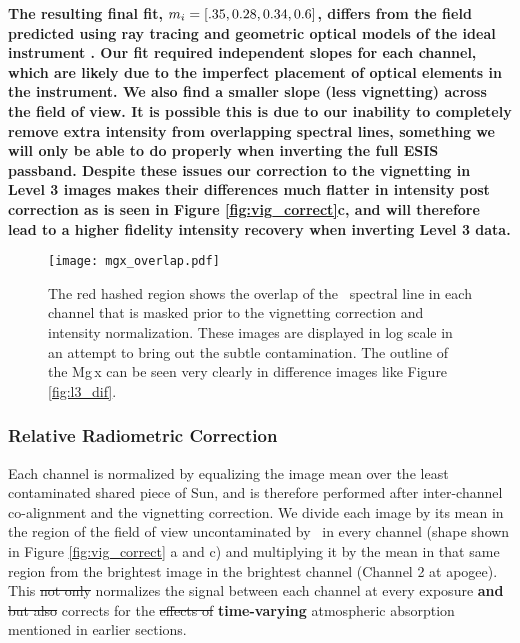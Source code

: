 \textbf{The resulting final fit, $m_i = [.35, 0.28, 0.34, 0.6]$, differs from the field predicted using ray tracing and geometric optical models of the ideal instrument \citep{ESIS}.
Our fit required independent slopes for each channel, which are likely due to the imperfect placement of optical elements in the instrument.
We also find a smaller slope (less vignetting) across the field of view.
It is possible this is due to our inability to completely remove extra intensity from overlapping spectral lines, something we will only be able to do properly when inverting the full ESIS passband.
Despite these issues our correction to the vignetting in Level 3 images makes their differences much flatter in intensity post correction as is seen in Figure \ref{fig:vig_correct}c, and will therefore lead to a higher fidelity intensity recovery when inverting Level 3 data.}


  
        
        \begin{figure}
        	\centering
        	\texttt{[image: mgx\_overlap.pdf]}
        	\caption{The red hashed region shows the overlap of the \mgxbright \ spectral line in each channel that is masked prior to the vignetting correction and intensity normalization. These images are displayed in log scale in an attempt to bring out the subtle contamination.  The outline of the Mg\,{\sc x} can be seen very clearly in difference images like Figure \ref{fig:l3_dif}.
        	}

        	\label{fig:mgx_overlap}
        \end{figure}
        
        

        
    \subsubsection{Relative Radiometric Correction }
        Each channel is normalized by equalizing the image mean over the least contaminated shared piece of Sun, and is therefore performed after inter-channel co-alignment and the vignetting correction.
        We divide each image by its mean in the region of the field of view uncontaminated by \mgxbright \ in every channel (shape shown in Figure \ref{fig:vig_correct} a and c) and multiplying it by the mean in that same region from the brightest image in the brightest channel (Channel 2 at apogee).
        This \sout{not only} normalizes the signal between each channel at every exposure \textbf{and} \sout{but also} corrects for the \sout{effects of} \textbf{time-varying} atmospheric absorption mentioned in earlier sections. 


